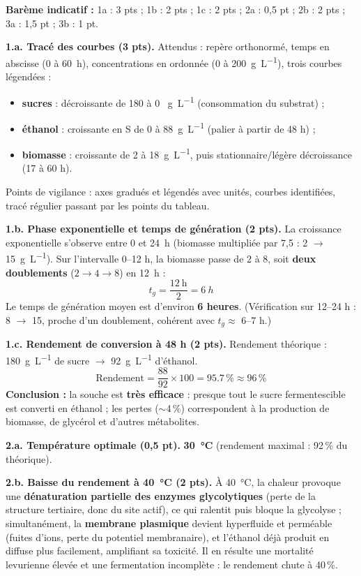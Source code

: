 \documentclass[11pt]{article}
\begin{document}
\begin{corrige}
\textbf{Barème indicatif :} 1a : 3 pts ; 1b : 2 pts ; 1c : 2 pts ; 2a : 0,5 pt ; 2b : 2 pts ; 3a : 1,5 pt ; 3b : 1 pt.

\textbf{1.a. Tracé des courbes (3 pts).} Attendus : repère orthonormé, temps en abscisse (0 à \SI{60}{h}), concentrations en ordonnée (0 à \SI{200}{g\per\liter}), trois courbes légendées :
\begin{itemize}
\item \textbf{sucres} : décroissante de 180 à 0 \SI{}{g\per\liter} (consommation du substrat) ;
\item \textbf{éthanol} : croissante en S de 0 à \SI{88}{g\per\liter} (palier à partir de 48 h) ;
\item \textbf{biomasse} : croissante de 2 à \SI{18}{g\per\liter}, puis stationnaire/légère décroissance (17 à 60 h).
\end{itemize}
Points de vigilance : axes gradués et légendés avec unités, courbes identifiées, tracé régulier passant par les points du tableau.

\textbf{1.b. Phase exponentielle et temps de génération (2 pts).} La croissance exponentielle s'observe entre 0 et \SI{24}{h} (biomasse multipliée par 7,5 : 2 $\rightarrow$ \SI{15}{g\per\liter}). Sur l'intervalle 0--12 h, la biomasse passe de 2 à 8, soit \textbf{deux doublements} ($2 \rightarrow 4 \rightarrow 8$) en \SI{12}{h} :
\[ t_g = \frac{12\ \text{h}}{2} = \SI{6}{h} \]
Le temps de génération moyen est d'environ \textbf{6 heures}. (Vérification sur 12--24 h : 8 $\rightarrow$ 15, proche d'un doublement, cohérent avec $t_g \approx$ 6--7 h.)

\textbf{1.c. Rendement de conversion à 48 h (2 pts).} Rendement théorique : \SI{180}{g\per\liter} de sucre $\rightarrow$ \SI{92}{g\per\liter} d'éthanol.
\[ \text{Rendement} = \frac{88}{92} \times 100 = \num{95,7}\,\% \approx 96\,\% \]
\textbf{Conclusion :} la souche est \textbf{très efficace} : presque tout le sucre fermentescible est converti en éthanol ; les pertes ($\sim$4\,\%) correspondent à la production de biomasse, de glycérol et d'autres métabolites.

\textbf{2.a. Température optimale (0,5 pt).} \textbf{\SI{30}{\degreeCelsius}} (rendement maximal : 92\,\% du théorique).

\textbf{2.b. Baisse du rendement à \SI{40}{\degreeCelsius} (2 pts).} À \SI{40}{\degreeCelsius}, la chaleur provoque une \textbf{dénaturation partielle des enzymes glycolytiques} (perte de la structure tertiaire, donc du site actif), ce qui ralentit puis bloque la glycolyse ; simultanément, la \textbf{membrane plasmique} devient hyperfluide et perméable (fuites d'ions, perte du potentiel membranaire), et l'éthanol déjà produit en diffuse plus facilement, amplifiant sa toxicité. Il en résulte une mortalité levurienne élevée et une fermentation incomplète : le rendement chute à 40\,\%.


\end{corrige}
\end{document}

